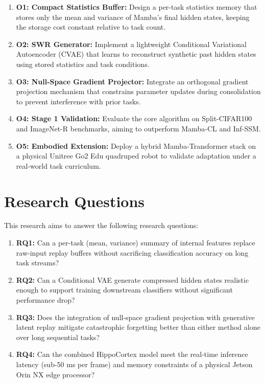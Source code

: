 \begin{enumerate}
    \item \textbf{O1: Compact Statistics Buffer:} Design a per-task statistics memory that stores only the mean and variance of Mamba's final hidden states, keeping the storage cost constant relative to task count.
    
    \item \textbf{O2: SWR Generator:} Implement a lightweight Conditional Variational Autoencoder (CVAE) that learns to reconstruct synthetic past hidden states using stored statistics and task conditions.
    
    \item \textbf{O3: Null-Space Gradient Projector:} Integrate an orthogonal gradient projection mechanism that constrains parameter updates during consolidation to prevent interference with prior tasks.
    
    \item \textbf{O4: Stage 1 Validation:} Evaluate the core algorithm on Split-CIFAR100 and ImageNet-R \cite{hendrycksManyFacesRobustness2021} benchmarks, aiming to outperform Mamba-CL and Inf-SSM.
    
    \item \textbf{O5: Embodied Extension:} Deploy a hybrid Mamba-Transformer stack on a physical Unitree Go2 Edu quadruped robot to validate adaptation under a real-world task curriculum.
\end{enumerate}

\section{Research Questions}
\label{sec:research_questions}

This research aims to answer the following research questions:

\begin{enumerate}
    \item \textbf{RQ1:} Can a per-task (mean, variance) summary of internal features replace raw-input replay buffers without sacrificing classification accuracy on long task streams?
    
    \item \textbf{RQ2:} Can a Conditional VAE generate compressed hidden states realistic enough to support training downstream classifiers without significant performance drop?
    
    \item \textbf{RQ3:} Does the integration of null-space gradient projection with generative latent replay mitigate catastrophic forgetting better than either method alone over long sequential tasks?
    
    \item \textbf{RQ4:} Can the combined HippoCortex model meet the real-time inference latency (sub-50 ms per frame) and memory constraints of a physical Jetson Orin NX edge processor?
\end{enumerate}

